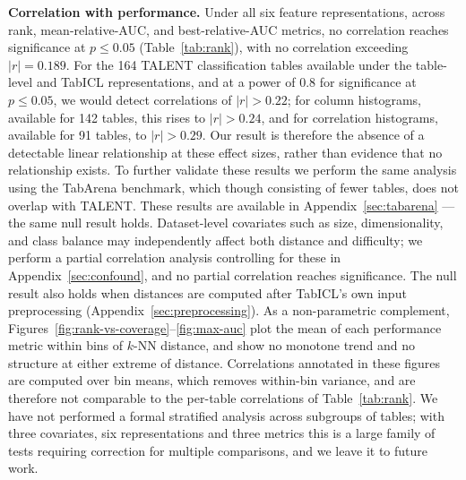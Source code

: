 \documentclass{article}
\begin{document}
\textbf{Correlation with performance.}
Under all six feature representations, across rank, mean-relative-AUC, and best-relative-AUC metrics, no correlation reaches significance at $p \leq 0.05$ (Table~\ref{tab:rank}), with no correlation exceeding $|r| = 0.189$.
For the 164 TALENT classification tables available under the table-level and TabICL representations, and at a power of $0.8$ for significance at $p \leq 0.05$, we would detect correlations of $|r| > 0.22$; for column histograms, available for 142 tables, this rises to $|r| > 0.24$, and for correlation histograms, available for 91 tables, to $|r| > 0.29$.
Our result is therefore the absence of a detectable linear relationship at these effect sizes, rather than evidence that no relationship exists.
To further validate these results we perform the same analysis using the TabArena benchmark, which though consisting of fewer tables, does not overlap with TALENT.
These results are available in Appendix~\ref{sec:tabarena} --- the same null result holds.
Dataset-level covariates such as size, dimensionality, and class balance may independently affect both distance and difficulty; we perform a partial correlation analysis controlling for these in Appendix~\ref{sec:confound}, and no partial correlation reaches significance.
The null result also holds when distances are computed after TabICL's own input preprocessing (Appendix~\ref{sec:preprocessing}).
As a non-parametric complement, Figures~\ref{fig:rank-vs-coverage}--\ref{fig:max-auc} plot the mean of each performance metric within bins of $k$-NN distance, and show no monotone trend and no structure at either extreme of distance. Correlations annotated in these figures are computed over bin means, which removes within-bin variance, and are therefore not comparable to the per-table correlations of Table~\ref{tab:rank}.
We have not performed a formal stratified analysis across subgroups of tables; with three covariates, six representations and three metrics this is a large family of tests requiring correction for multiple comparisons, and we leave it to future work.
\end{document}
